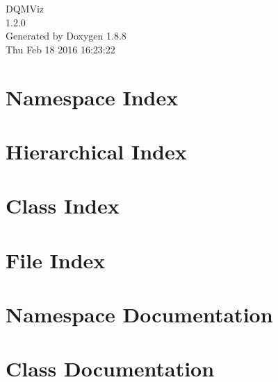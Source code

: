 \documentclass[twoside]{book}
\newcommand{\+}{\discretionary{\mbox{\scriptsize$\hookleftarrow$}}{}{}}
\newcommand{\clearemptydoublepage}{%
  \newpage{\pagestyle{empty}\cleardoublepage}%
}
\begin{document}
\begin{titlepage}
\vspace*{7cm}
\begin{center}%
{\Large D\+Q\+M\+Viz \\[1ex]\large 1.\+2.\+0 }\\
\vspace*{1cm}
{\large Generated by Doxygen 1.8.8}\\
\vspace*{0.5cm}
{\small Thu Feb 18 2016 16:23:22}\\
\end{center}
\end{titlepage}
\clearemptydoublepage
\tableofcontents
\clearemptydoublepage
{}

\chapter{Namespace Index}

\chapter{Hierarchical Index}

\chapter{Class Index}

\chapter{File Index}

\chapter{Namespace Documentation}

\chapter{Class Documentation}






















\end{document}
